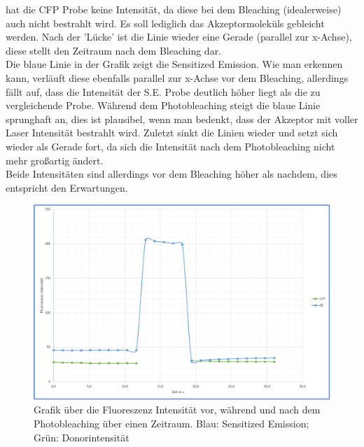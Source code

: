 hat die CFP Probe keine Intensität, da diese bei dem Bleaching (idealerweise) auch nicht bestrahlt
wird. Es soll lediglich das Akzeptormoleküls gebleicht werden.
Nach der 'Lücke' ist die Linie wieder eine Gerade (parallel zur x-Achse), diese stellt den Zeitraum
nach dem Bleaching dar. \\
Die blaue Linie in der Grafik zeigt die Sensitized Emission. Wie man erkennen kann, 
verläuft diese ebenfalls parallel zur x-Achse vor dem Bleaching, allerdings fällt auf, 
dass die Intensität der S.E. Probe deutlich höher liegt als die zu vergleichende
Probe. Während dem Photobleaching steigt die blaue Linie sprunghaft an, 
dies ist plausibel, wenn man bedenkt, dass der Akzeptor mit voller 
Laser Intensität bestrahlt wird. Zuletzt sinkt die 
Linien wieder und setzt sich wieder als Gerade fort, da sich die Intensität 
nach dem Photobleaching nicht mehr großartig ändert.\\
Beide Intensitäten sind allerdings vor dem Bleaching höher als nachdem, dies entspricht den Erwartungen.\\
\begin{figure}[h]
\centering
  \includegraphics[scale=0.3]{Bilder/Auswertung_Anna/plot.PNG}
  \caption{Grafik über die Fluoreszenz Intensität vor, während und nach dem Photobleaching über einen Zeitraum. Blau: Sensitized Emission; Grün: Donorintensität}
  \label{fig:plotA2}
\end{figure}\\
